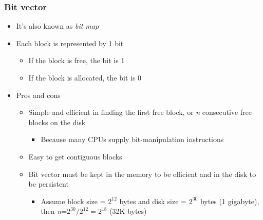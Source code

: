 \documentclass[CJKutf8,xcolor=pdftex,dvipsnames,table]{beamer}
\begin{document}
\begin{CJK*}{UTF8}{song}
  \begin{frame}
    \frametitle{Bit vector} \pause
    \begin{itemize}\parskip=0pt
    \item It's also known as \emph{bit map} \pause
    \item Each block is represented by 1 bit \pause
      \begin{itemize}\parskip=0pt
      \item If the block is free, the bit is 1 \pause
      \item If the block is allocated, the bit is 0 \pause
      \end{itemize}
    \item Pros and cons \pause
      \begin{itemize}\parskip=0pt
      \item Simple and efficient in finding the first free block, or \emph{n} consecutive free blocks on the disk \pause
        \begin{itemize}\parskip=0pt
        \item Because many CPUs supply bit-manipulation instructions \pause
        \end{itemize}
      \item Easy to get contiguous blocks
      \item Bit vector must be kept in the memory to be efficient and in the disk to be persistent \pause
        \begin{itemize}\parskip=0pt
        \item Assume block size = $2^{12}$ bytes and disk size = $2^{30}$ bytes (1 gigabyte), then \emph{n}=$2^{30}/2^{12}=2^{18}$ (32K bytes)
        \end{itemize}
      \end{itemize}
    \end{itemize}
  \end{frame}
  

\end{CJK*}
\end{document}
